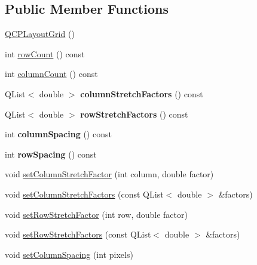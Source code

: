 \subsection*{Public Member Functions}
\begin{DoxyCompactItemize}
\item 
\mbox{\hyperlink{class_q_c_p_layout_grid_ab2a4c1587dc8aed4c41c509c8d8d2a64}{Q\+C\+P\+Layout\+Grid}} ()
\item 
int \mbox{\hyperlink{class_q_c_p_layout_grid_a19c66fd76cbce58a8e94f33797e0c0aa}{row\+Count}} () const
\item 
int \mbox{\hyperlink{class_q_c_p_layout_grid_a1a2962cbf45011405b64b913afa8e7a2}{column\+Count}} () const
\item 
\mbox{\label{class_q_c_p_layout_grid_a8e0e587c386bbcd1b94119f5f44c512d}} 
Q\+List$<$ double $>$ {\bfseries column\+Stretch\+Factors} () const
\item 
\mbox{\label{class_q_c_p_layout_grid_aa33408586427e77e05f79defde7f3568}} 
Q\+List$<$ double $>$ {\bfseries row\+Stretch\+Factors} () const
\item 
\mbox{\label{class_q_c_p_layout_grid_adcf4c387d5996bf6e4ae0ed26138247e}} 
int {\bfseries column\+Spacing} () const
\item 
\mbox{\label{class_q_c_p_layout_grid_a4cb6c680505cd0ce6f85b9e217fd2cd0}} 
int {\bfseries row\+Spacing} () const
\item 
void \mbox{\hyperlink{class_q_c_p_layout_grid_ae38f31a71687b9d7ee3104852528fb50}{set\+Column\+Stretch\+Factor}} (int column, double factor)
\item 
void \mbox{\hyperlink{class_q_c_p_layout_grid_a6c2591d1a7e2534ce036989543b49e57}{set\+Column\+Stretch\+Factors}} (const Q\+List$<$ double $>$ \&factors)
\item 
void \mbox{\hyperlink{class_q_c_p_layout_grid_a7b0273de5369bd93d942edbaf5b166ec}{set\+Row\+Stretch\+Factor}} (int row, double factor)
\item 
void \mbox{\hyperlink{class_q_c_p_layout_grid_a200b45f9c908f96ebadaa3c8d87a2782}{set\+Row\+Stretch\+Factors}} (const Q\+List$<$ double $>$ \&factors)
\item 
void \mbox{\hyperlink{class_q_c_p_layout_grid_a3a49272aba32bb0fddc3bb2a45a3dba0}{set\+Column\+Spacing}} (int pixels)

\end{DoxyCompactItemize}
